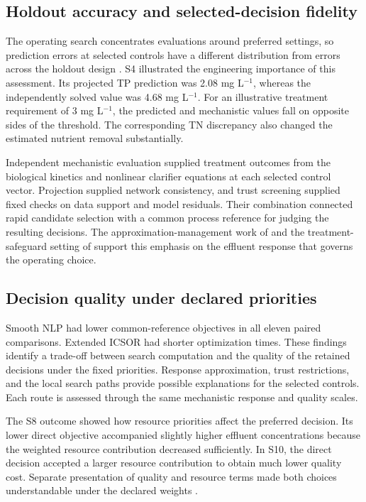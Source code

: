 \subsection{Holdout accuracy and selected-decision fidelity}

The operating search concentrates evaluations around preferred settings, so prediction errors at selected controls have a different distribution from errors across the holdout design \citep{BhosekarIerapetritou2018,Pedrozo2025}. S4 illustrated the engineering importance of this assessment. Its projected TP prediction was 2.08 mg L$^{-1}$, whereas the independently solved value was 4.68 mg L$^{-1}$. For an illustrative treatment requirement of 3 mg L$^{-1}$, the predicted and mechanistic values fall on opposite sides of the threshold. The corresponding TN discrepancy also changed the estimated nutrient removal substantially.

Independent mechanistic evaluation supplied treatment outcomes from the biological kinetics and nonlinear clarifier equations at each selected control vector. Projection supplied network consistency, and trust screening supplied fixed checks on data support and model residuals. Their combination connected rapid candidate selection with a common process reference for judging the resulting decisions. The approximation-management work of \citet{Hameed2026} and the treatment-safeguard setting of \citet{Ren2026} support this emphasis on the effluent response that governs the operating choice.

\subsection{Decision quality under declared priorities}

Smooth NLP had lower common-reference objectives in all eleven paired comparisons. Extended ICSOR had shorter optimization times. These findings identify a trade-off between search computation and the quality of the retained decisions under the fixed priorities. Response approximation, trust restrictions, and the local search paths provide possible explanations for the selected controls. Each route is assessed through the same mechanistic response and quality scales.

The S8 outcome showed how resource priorities affect the preferred decision. Its lower direct objective accompanied slightly higher effluent concentrations because the weighted resource contribution decreased sufficiently. In S10, the direct decision accepted a larger resource contribution to obtain much lower quality cost. Separate presentation of quality and resource terms made both choices understandable under the declared weights \citep{PadronPaez2020,Aboagye2021}.

